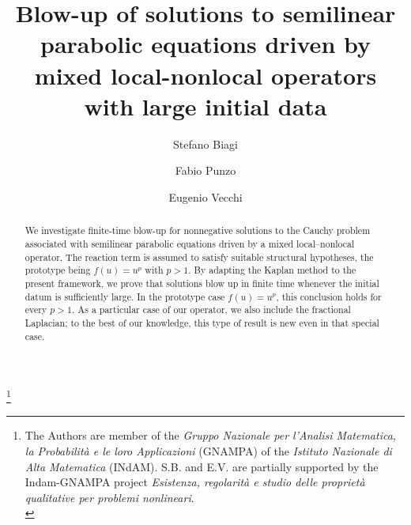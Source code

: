 \documentclass[11pt,a4paper,reqno]{amsart}
\theoremstyle{definition}
\theoremstyle{plain}
\numberwithin{equation}{section}
\begin{document}
 \title[Local-Nonlocal Fujita type results]
 {Blow-up of solutions to  semilinear parabolic equations driven by mixed local-nonlocal operators \\ with large initial data}

 \author[S.\,Biagi]{Stefano Biagi}
 \author[F.\,Punzo]{Fabio Punzo}
 \author[E.\,Vecchi]{Eugenio Vecchi}

 \address[S.\,Biagi]{Dipartimento di Matematica
 \newline\indent Politecnico di Milano \newline\indent
 Via Bonardi 9, 20133 Milano, Italy}

 \address[F.\,Punzo]{Dipartimento di Matematica
 \newline\indent Politecnico di Milano \newline\indent
 Via Bonardi 9, 20133 Milano, Italy}

 \address[E.\,Vecchi]{Dipartimento di Matematica
 \newline\indent Università di Bologna \newline\indent
 Piazza di Porta San Donato 5, 40126 Bologna, Italy}



\thanks{The Authors are
member of the {\em Gruppo Nazionale per
l'Analisi Ma\-te\-ma\-ti\-ca, la Probabilit\`a e le loro Applicazioni}
(GNAMPA) of the {\em Istituto Nazionale di Alta Matematica} (INdAM). S.B. and E.V. are partially supported by the
Indam-GNAMPA project {\em Esistenza, regolarità e studio delle proprietà qualitative per problemi nonlineari}.\\}


 \begin{abstract}
We investigate finite-time blow-up for nonnegative solutions to the
Cauchy problem associated with semilinear parabolic equations driven
by a mixed local--nonlocal operator. The reaction term is assumed to
satisfy suitable structural hypotheses, the prototype being
$f(u)=u^p$ with $p>1$. By adapting the Kaplan method to the present
framework, we prove that solutions blow up in finite time whenever
the initial datum is sufficiently large. In the prototype case
$f(u)=u^p$, this conclusion holds for every $p>1$. As a particular case of our operator, we also include the fractional
Laplacian; to the best of our knowledge, this type of result is new
even in that special case.
 \end{abstract}
\end{document}
